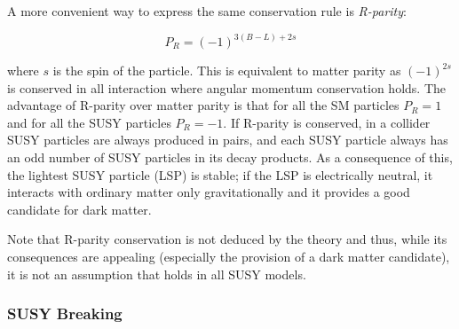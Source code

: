 A more convenient way to express the same conservation rule is \textit{R-parity}:

\begin{equation}
P_R = (-1)^{3(B-L) + 2 s}
\label{eq:defRparity}
\end{equation}

where $s$ is the spin of the particle. This is equivalent to matter parity as $(-1)^{2s}$ is conserved in all interaction where angular momentum conservation holds. The advantage of R-parity over matter parity is that for all the SM particles $P_R = 1$ and for all the SUSY particles $P_R=-1$. If  R-parity is conserved, in a collider SUSY particles are always produced in pairs, and each SUSY particle always has an odd number of SUSY particles in its decay products. As a consequence of this, the lightest SUSY particle (LSP) is stable; if the LSP is electrically neutral, it interacts with ordinary matter only gravitationally and it provides a good candidate for dark matter.

Note that R-parity conservation is not deduced by the theory and thus, while its consequences are appealing (especially the provision of a dark matter candidate), it is not an assumption that holds in all SUSY models.

\subsubsection{SUSY Breaking}


